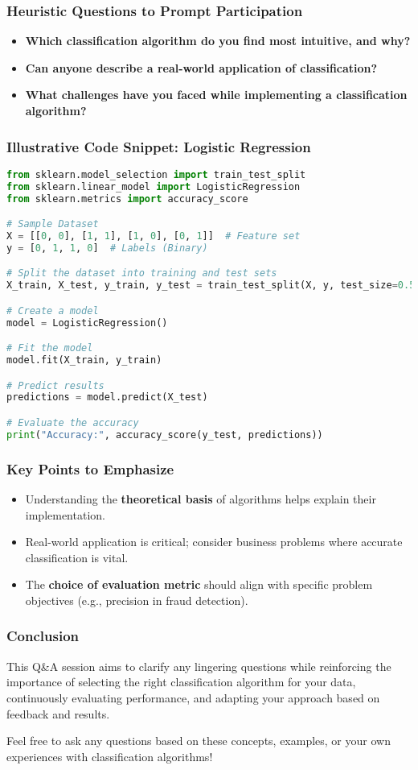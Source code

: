 \documentclass[aspectratio=169]{beamer}
\begin{document}
\begin{frame}[fragile]
    \frametitle{Heuristic Questions to Prompt Participation}
    \begin{itemize}
        \item \textbf{Which classification algorithm do you find most intuitive, and why?}
        \item \textbf{Can anyone describe a real-world application of classification?}
        \item \textbf{What challenges have you faced while implementing a classification algorithm?}
    \end{itemize}
\end{frame}

\begin{frame}[fragile]
    \frametitle{Illustrative Code Snippet: Logistic Regression}
    \begin{lstlisting}[language=Python]
from sklearn.model_selection import train_test_split
from sklearn.linear_model import LogisticRegression
from sklearn.metrics import accuracy_score

# Sample Dataset
X = [[0, 0], [1, 1], [1, 0], [0, 1]]  # Feature set
y = [0, 1, 1, 0]  # Labels (Binary)

# Split the dataset into training and test sets
X_train, X_test, y_train, y_test = train_test_split(X, y, test_size=0.5)

# Create a model
model = LogisticRegression()

# Fit the model
model.fit(X_train, y_train)

# Predict results
predictions = model.predict(X_test)

# Evaluate the accuracy
print("Accuracy:", accuracy_score(y_test, predictions))
    \end{lstlisting}
\end{frame}

\begin{frame}
    \frametitle{Key Points to Emphasize}
    \begin{itemize}
        \item Understanding the \textbf{theoretical basis} of algorithms helps explain their implementation.
        \item Real-world application is critical; consider business problems where accurate classification is vital.
        \item The \textbf{choice of evaluation metric} should align with specific problem objectives (e.g., precision in fraud detection).
    \end{itemize}
\end{frame}

\begin{frame}
    \frametitle{Conclusion}
    This Q\&A session aims to clarify any lingering questions while reinforcing the importance of selecting the right classification algorithm for your data, continuously evaluating performance, and adapting your approach based on feedback and results.

    Feel free to ask any questions based on these concepts, examples, or your own experiences with classification algorithms!
\end{frame}
\end{document}
